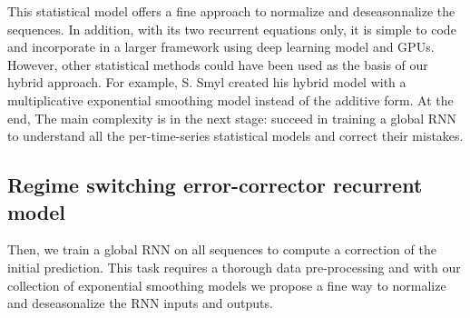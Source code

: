 \documentclass[letterpaper]{article} %
\begin{document}

This statistical model offers a fine approach to normalize and deseasonnalize the sequences. In addition, with its two recurrent equations only, it is simple to code and incorporate in a larger framework using deep learning model and GPUs. However, other statistical methods could have been used as the basis of our hybrid approach. For example, S. Smyl created his hybrid model with a multiplicative exponential smoothing model instead of the additive form. At the end, The main complexity is in the next stage: succeed in training a global RNN to understand all the per-time-series statistical models and correct their mistakes.

\subsection{Regime switching error-corrector recurrent model}

Then, we train a global RNN on all sequences to compute a correction of the initial prediction. %
This task requires a thorough data pre-processing and with our collection of exponential smoothing models  we propose a fine way to normalize and deseasonalize the RNN inputs and outputs. %
\end{document}
